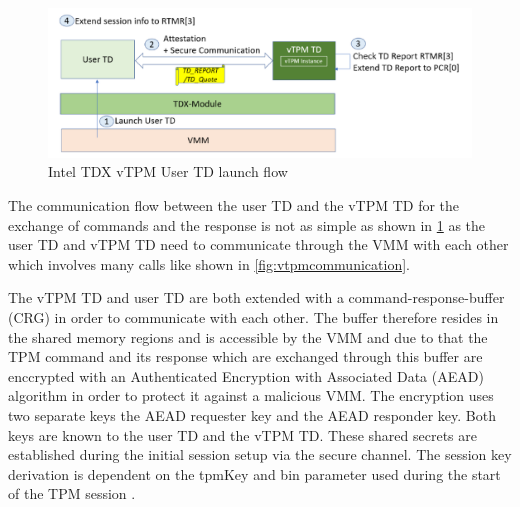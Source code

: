 \documentclass[sigplan,screen,nonacm]{acmart}
\begin{document}
\begin{figure}
  \centering
  \includegraphics[width=\linewidth]{pictures/vTPM_TD_launch.png}
  \caption{Intel TDX vTPM User TD launch flow \cite{Intel-vTPM}}
  \label{fig:vtpmlaunchusertd}
\end{figure}

 The communication flow between the user TD and the vTPM TD for the exchange of commands and the response is not as simple as shown in \cref{fig:vtpmlaunchusertd} as the user TD and vTPM TD need to communicate through the VMM with each other which involves many calls like shown in \cref{fig:vtpmcommunication}.

The vTPM TD and user TD are both extended with a command-response-buffer (CRG) in order to communicate with each other.
The buffer therefore resides in the shared memory regions and is accessible by the VMM and due to that the TPM command and its response which are exchanged through this buffer are enccrypted with an Authenticated Encryption with Associated Data (AEAD) algorithm in order to protect it against a malicious VMM.
The encryption uses two separate keys the AEAD requester key and the AEAD responder key.
Both keys are known to the user TD and the vTPM TD.
These shared secrets are established during the initial session setup via the secure channel.
The session key derivation is dependent on the tpmKey and bin parameter used during the start of the TPM session \cite[p. 10]{TPM-Mitigation}.
\end{document}
